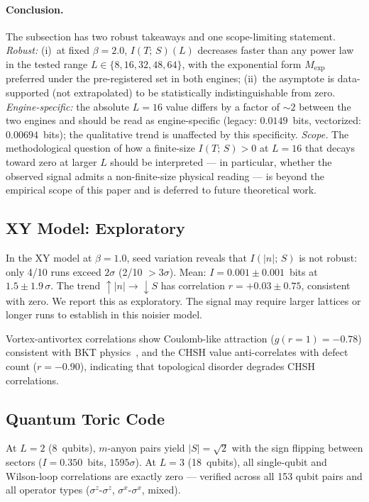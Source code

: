 \documentclass[aps,pra,twocolumn,superscriptaddress,showpacs,floatfix]{revtex4-2}
\newcommand{\MI}{I(T;\,S)}
\begin{document}
\paragraph{Conclusion.}
The subsection has two robust takeaways and one scope-limiting statement.
\emph{Robust:} (i)~at fixed $\beta=2.0$, $\MI(L)$ decreases faster than any
power law in the tested range $L \in \{8,16,32,48,64\}$, with the
exponential form $M_\mathrm{exp}$ preferred under the pre-registered set in
both engines; (ii)~the asymptote is data-supported (not extrapolated) to be
statistically indistinguishable from zero. \emph{Engine-specific:} the
absolute $L=16$ value differs by a factor of $\sim 2$ between the two
engines and should be read as engine-specific (legacy: $0.0149$~bits,
vectorized: $0.00694$~bits); the qualitative trend is unaffected by this
specificity. \emph{Scope.} The methodological question of how a
finite-size $\MI > 0$ at $L=16$ that decays toward zero at larger $L$
should be interpreted --- in particular, whether the observed signal admits
a non-finite-size physical reading --- is beyond the empirical scope of this
paper and is deferred to future theoretical work.

\subsection{XY Model: Exploratory}

In the XY model at $\beta = 1.0$, seed variation reveals that $I(|n|;\,S)$ is not
robust: only 4/10 runs exceed $2\sigma$ (2/10 ${>}3\sigma$). Mean:
$I = 0.001 \pm 0.001$~bits at $1.5 \pm 1.9\,\sigma$. The trend
$\uparrow|n| \to \downarrow S$ has correlation $r = +0.03 \pm 0.75$, consistent
with zero. We report this as exploratory. The signal may require larger lattices
or longer runs to establish in this noisier model.

Vortex-antivortex correlations show Coulomb-like attraction ($g(r{=}1) = -0.78$)
consistent with BKT physics~\cite{KT1973}, and the CHSH value anti-correlates
with defect count ($r = -0.90$), indicating that topological disorder degrades
CHSH correlations.

\subsection{Quantum Toric Code}

At $L = 2$ (8~qubits), $m$-anyon pairs yield $|S| = \sqrt{2}$ with the sign
flipping between sectors ($I = 0.350$~bits, $1595\sigma$). At $L = 3$
(18~qubits), all single-qubit and Wilson-loop correlations are exactly zero ---
verified across all 153 qubit pairs and all operator types
($\sigma^z$-$\sigma^z$, $\sigma^x$-$\sigma^x$, mixed).
\end{document}
